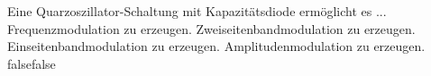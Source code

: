     {Eine Quarzoszillator-Schaltung mit Kapazitätsdiode ermöglicht es ...}
    {Frequenzmodulation zu erzeugen.}
    {Zweiseitenbandmodulation zu erzeugen.}
    {Einseitenbandmodulation zu erzeugen.}
    {Amplitudenmodulation zu erzeugen.}
    {false}{false}